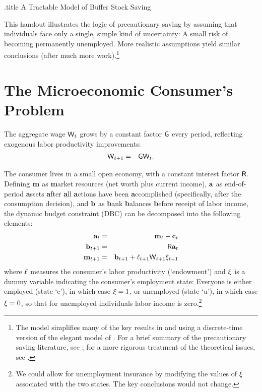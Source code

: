 \documentclass{handout}
\begin{document}
\large
\handoutHeader
\providecommand{\dmEqZero}{\ensuremath{\Delta\mRatE=0}}
\providecommand{\dcEqZero}{\ensuremath{\Delta\cRatE=0}}

\begin{verbatimwrite}{\jobname.title}
A Tractable Model of Buffer Stock Saving
\end{verbatimwrite}

\handoutNameMake


This handout illustrates the logic of precautionary saving by assuming
that individuals face only a single, simple kind of uncertainty: A small risk of becoming permanently unemployed.  More realistic assumptions yield similar conclusions (after much more work).\footnote{The model simplifies many of the key results in \cite{carroll:brookings} and \cite{carroll:bslcpih} using a  discrete-time version of the elegant model of \cite{toche:urisk}.
  For a brief summary of the precautionary saving literature, see
  \cite{CarrollKimballPSPW}; for a more rigorous   treatment of the theoretical issues, see \cite{carrollBSTheory}.}

\section{The Microeconomic Consumer's Problem}
The aggregate wage $\mathsf{W}_{t}$ grows
by a constant factor $\mathsf{G}$ every period, reflecting exogenous labor productivity improvements:
\begin{eqnarray}
        \mathsf{W}_{t+1} & = & \mathsf{G} \mathsf{W}_{t}.
\end{eqnarray}

The consumer lives in a small open economy, with a constant interest factor $\mathsf{R}$.  Defining $\mathbf{m}$ as
{\bf m}arket resources (net worth plus current income), $\mathbf{a}$ as
end-of-period {\bf a}ssets {\bf a}fter {\bf a}ll {\bf a}ctions have been {\bf a}ccomplished
(specifically, after the consumption decision), and $\mathbf{b}$ as {\bf b}ank
{\bf b}alances {\bf b}efore receipt of labor income, the dynamic budget constraint (DBC) can be decomposed into the
following elements:
\begin{eqnarray}
    \mathbf{a}_{t} & = & \mathbf{m}_{t}-\mathbf{c}_{t}
\\  \mathbf{b}_{t+1} & = & \mathsf{R} \mathbf{a}_{t}
\\  \mathbf{m}_{t+1} & = & \mathbf{b}_{t+1}+\ell_{t+1}\mathsf{W}_{t+1}\xi_{t+1}  \label{eq:DBC}
\end{eqnarray}
where $\ell$ measures the consumer's labor productivity
(`endowment') and $\xi$ is a dummy variable indicating the
consumer's employment state: Everyone is either
employed (state `e'), in which case $\xi = 1$, or unemployed
(state `u'), in which case $\xi=0$, so that for unemployed
individuals labor income is zero.\footnote{We could allow for
  unemployment insurance by modifying the values of $\xi$
  associated with the two states.  The key conclusions would not
  change.}
\end{document}
